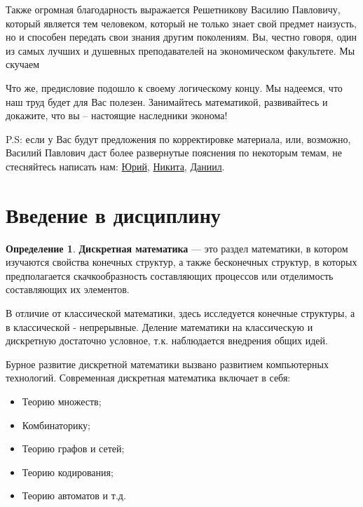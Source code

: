\documentclass[12pt, a4paper, oneside]{article}
\theoremstyle{plain} %
\theoremstyle{definition}
\newtheorem*{definition}{Определение}  %
\newcommand{\indef}[1]{\textbf{ \color{dark_red} #1}}
\begin{document}
Также огромная благодарность выражается Решетникову Василию Павловичу, который является тем человеком, который не только знает свой предмет наизусть, но и способен передать свои знания другим поколениям. Вы, честно говоря, один из самых лучших и душевных преподавателей на экономическом факультете. Мы скучаем
\Heart \Heart \Heart 


Что же, предисловие подошло к своему логическому концу. Мы надеемся, что наш труд будет для Вас полезен. Занимайтесь математикой, развивайтесь и докажите, что вы – настоящие наследники эконома!



P.S: если у Вас будут предложения по корректировке материала, или, возможно, Василий Павлович даст более развернутые пояснения по некоторым темам, не стесняйтесь написать нам: \href{https://vk.com/penzenskiy_ds}{Юрий}, \href{https://vk.com/k.onill}{Никита},  \href{https://vk.com/surealrzdnt}{Даниил}. 


\hspace{1mm} \section*{Введение в дисциплину}

\begin{definition}
\indef{Дискретная математика} --- это раздел математики, в котором изучаются свойства конечных структур, а также бесконечных структур, в которых предполагается скачкообразность составляющих процессов или отделимость составляющих их элементов.
\end{definition}

В отличие от классической математики, здесь исследуется конечные структуры, 
а в классической - непрерывные. Деление математики на классическую и дискретную достаточно условное, т.к. наблюдается внедрения общих идей.

Бурное развитие дискретной математики вызвано развитием компьютерных технологий.
Современная дискретная математика включает в себя:
  
\begin{itemize}
    \item Теорию множеств;  
    \item Комбинаторику;        
    \item Теорию графов и сетей;
    \item Теорию кодирования;
    \item Теорию автоматов и т.д.
\end{itemize}
\end{document}
